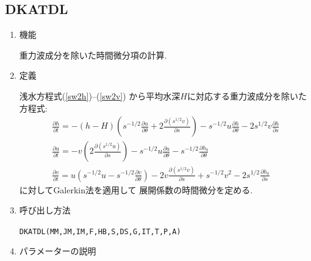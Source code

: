 \documentclass[a4j,fleqn]{jarticle}
\begin{document}

\subsection{DKATDL}

\begin{enumerate}

\item 機能 

重力波成分を除いた時間微分項の計算.

\item 定義

浅水方程式(\ref{sw2h})--(\ref{sw2v})
から平均水深$H$に対応する重力波成分を除いた方程式:
\begin{gather}
\frac{\partial h}{\partial t}
= 
-(h-H)\left(s^{-1/2}\frac{\partial u}{\partial\theta}
   +2\frac{\partial( s^{1/2}v)}{\partial s}\right)
   -s^{-1/2}u\frac{\partial h}{\partial\theta}
   -2s^{1/2}v\frac{\partial h}{\partial s}
   \\
\frac{\partial u}{\partial t}
= -v\left(2\frac{\partial(s^{1/2}u)}{\partial s}\right)
   -s^{-1/2}u\frac{\partial u}{\partial\theta}
   -s^{-1/2}\frac{\partial h_b}{\partial\theta}
   \\
\frac{\partial v}{\partial t}
= 
u\left(s^{-1/2}u-s^{-1/2}\frac{\partial v}{\partial\theta}\right)
   -2v\frac{\partial(s^{1/2}v)}{\partial s}
   +s^{-1/2}v^2
   -2s^{1/2}\frac{\partial h_b}{\partial s}
\end{gather}
に対してGalerkin法を適用して
展開係数の時間微分を定める. 

\item 呼び出し方法 
    
{\tt DKATDL(MM,JM,IM,F,HB,S,DS,G,IT,T,P,A)}
  
\item パラメーターの説明 
    

\end{enumerate}
\end{document}
